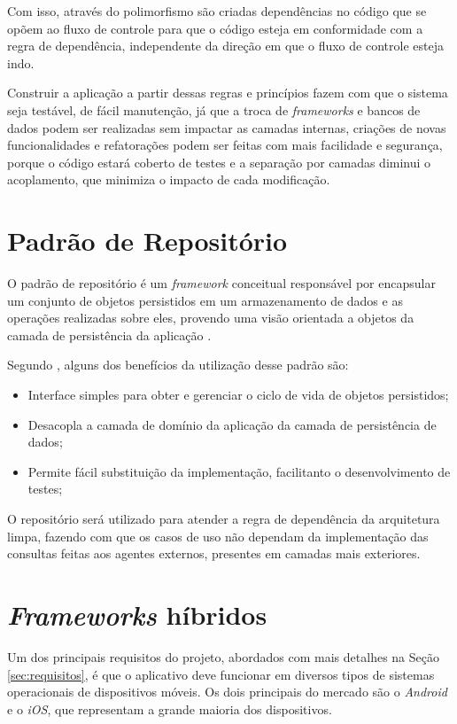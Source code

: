 Com isso, através do polimorfismo são criadas dependências no código que se opõem ao fluxo de controle para que o código esteja em conformidade com a regra de dependência, independente da direção em que o fluxo de controle esteja indo.

Construir a aplicação a partir dessas regras e princípios fazem com que o sistema seja testável, de fácil manutenção, já que a troca de \textit{frameworks} e bancos de dados podem ser realizadas sem impactar as camadas internas, criações de novas funcionalidades e refatorações podem ser feitas com mais facilidade e segurança, porque o código estará coberto de testes e a separação por camadas diminui o acoplamento, que minimiza o impacto de cada modificação.

\section{Padrão de Repositório}\label{sec:repositorypattern}

O padrão de repositório é um \textit{framework} conceitual responsável por encapsular um conjunto de objetos persistidos em um armazenamento de dados e as operações realizadas sobre eles, provendo uma visão orientada a objetos da camada de persistência da aplicação \cite{patterns}.

Segundo \textcite{ddd}, alguns dos benefícios da utilização desse padrão são:

\begin{itemize}
    \item Interface simples para obter e gerenciar o ciclo de vida de objetos persistidos;
    \item Desacopla a camada de domínio da aplicação da camada de persistência de dados;
    \item Permite fácil substituição da implementação, facilitanto o desenvolvimento de testes;
\end{itemize}

O repositório será utilizado para atender a regra de dependência da arquitetura limpa, fazendo com que os casos de uso não dependam da implementação das consultas feitas aos agentes externos, presentes em camadas mais exteriores.

\section{\textit{Frameworks} híbridos}\label{sec:flutter}
Um dos principais requisitos do projeto, abordados com mais detalhes na Seção \ref{sec:requisitos}, é que o aplicativo deve funcionar em diversos tipos de sistemas operacionais de dispositivos móveis. Os dois principais do mercado são o \textit{Android} e o \textit{iOS}, que representam a grande maioria dos dispositivos.

